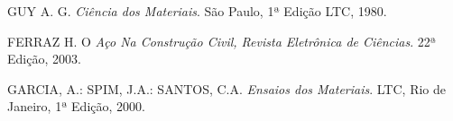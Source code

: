 \documentclass[journal]{IEEEtran}
\begin{document}
\begin{thebibliography}{9}    
    
    GUY A. G. 
    \emph{Ciência dos Materiais}. 
    São Paulo, 1ª Edição LTC, 
    1980.

FERRAZ H. O 
\emph{Aço Na Construção Civil, Revista Eletrônica de Ciências}.
22ª Edição, 2003.

  GARCIA, A.: SPIM, J.A.: SANTOS, C.A.
  \emph{Ensaios dos Materiais}. 
    LTC, Rio de Janeiro,  1ª Edição, 2000.
   
\end{thebibliography}
\end{document}
